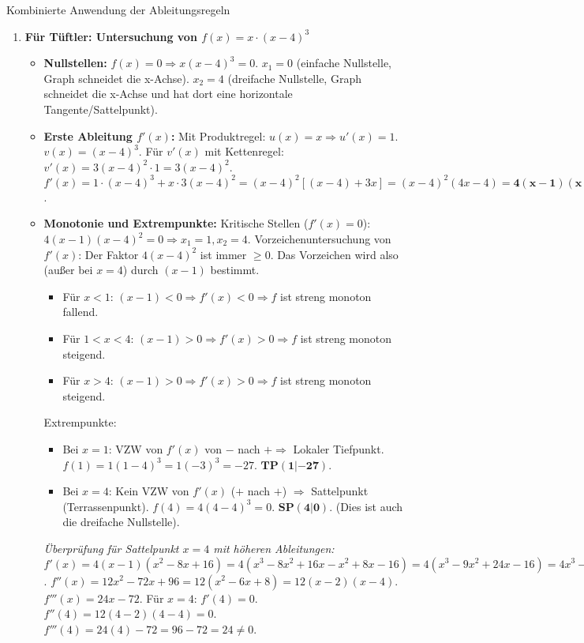 \begin{loesungsumgebung}{Kombinierte Anwendung der Ableitungsregeln}
\begin{enumerate}[label=(\alph*)]
    \item \textbf{Für Tüftler: Untersuchung von $f(x) = x \cdot (x-4)^3$}
    \begin{itemize}
        \item \textbf{Nullstellen:}
        $f(x)=0 \Rightarrow x(x-4)^3=0$.
        $x_1 = 0$ (einfache Nullstelle, Graph schneidet die x-Achse).
        $x_2 = 4$ (dreifache Nullstelle, Graph schneidet die x-Achse und hat dort eine horizontale Tangente/Sattelpunkt).
        \item \textbf{Erste Ableitung $f'(x)$:}
        Mit Produktregel: $u(x)=x \Rightarrow u'(x)=1$. $v(x)=(x-4)^3$.
        Für $v'(x)$ mit Kettenregel: $v'(x)=3(x-4)^2 \cdot 1 = 3(x-4)^2$.
        $f'(x) = 1 \cdot (x-4)^3 + x \cdot 3(x-4)^2 = (x-4)^2[(x-4)+3x] = (x-4)^2(4x-4) = \mathbf{4(x-1)(x-4)^2}$.
        \item \textbf{Monotonie und Extrempunkte:}
        Kritische Stellen ($f'(x)=0$): $4(x-1)(x-4)^2=0 \Rightarrow x_1=1, x_2=4$.
        Vorzeichenuntersuchung von $f'(x)$: Der Faktor $4(x-4)^2$ ist immer $\ge 0$. Das Vorzeichen wird also (außer bei $x=4$) durch $(x-1)$ bestimmt.
        \begin{itemize}
            \item Für $x < 1$: $(x-1)<0 \Rightarrow f'(x) < 0 \Rightarrow f$ ist streng monoton fallend.
            \item Für $1 < x < 4$: $(x-1)>0 \Rightarrow f'(x) > 0 \Rightarrow f$ ist streng monoton steigend.
            \item Für $x > 4$: $(x-1)>0 \Rightarrow f'(x) > 0 \Rightarrow f$ ist streng monoton steigend.
        \end{itemize}
        Extrempunkte:
        \begin{itemize}
            \item Bei $x=1$: VZW von $f'(x)$ von $-$ nach $+ \Rightarrow$ Lokaler Tiefpunkt.
            $f(1) = 1(1-4)^3 = 1(-3)^3 = -27$. $\mathbf{TP(1|-27)}$.
            \item Bei $x=4$: Kein VZW von $f'(x)$ ($+$ nach $+$) $\Rightarrow$ Sattelpunkt (Terrassenpunkt).
            $f(4) = 4(4-4)^3 = 0$. $\mathbf{SP(4|0)}$. (Dies ist auch die dreifache Nullstelle).
        \end{itemize}
        \textit{Überprüfung für Sattelpunkt $x=4$ mit höheren Ableitungen:}
        $f'(x) = 4(x-1)(x^2-8x+16) = 4(x^3-8x^2+16x-x^2+8x-16) = 4(x^3-9x^2+24x-16) = 4x^3-36x^2+96x-64$.
        $f''(x) = 12x^2-72x+96 = 12(x^2-6x+8) = 12(x-2)(x-4)$.
        $f'''(x) = 24x-72$.
        Für $x=4$: $f'(4)=0$. $f''(4)=12(4-2)(4-4)=0$. $f'''(4)=24(4)-72 = 96-72=24 \neq 0$.

\end{itemize}
\end{enumerate}
\end{loesungsumgebung}
